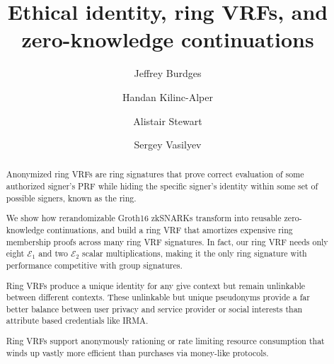 \documentclass[runningheads,evcountsame,a4paper,11pt,orivec]{llncs}
\title{Ethical identity, ring VRFs, and zero-knowledge continuations}
\author{Jeffrey Burdges \and Handan Kilinc-Alper \and Alistair Stewart \and Sergey Vasilyev}
\date{}
\def\eprint#1#2{#2} %
\def\eprintsmallskip{\smallskip}{}
\begin{document}
	
\maketitle

\begin{abstract}
Anonymized ring VRFs are ring signatures that prove correct evaluation of some authorized signer's PRF while hiding the specific signer's identity within some set of possible signers, known as the ring.
\eprint{We propose ring VRFs as a natural fulcrum around which a diverse array of zkSNARK circuits turn, making them an ideal target for optimization and eventually standards.

}{}
\eprintsmallskip

We show how rerandomizable Groth16 zkSNARKs transform into reusable zero-knowledge continuations, and build a ring VRF that amortizes expensive ring membership proofs across many ring VRF signatures.
In  fact, our ring VRF needs only eight $\mathcal{E}_1$ and two $\mathcal{E}_2$ scalar multiplications, making it the only ring signature with performance competitive with group signatures.

\eprintsmallskip

Ring VRFs produce a unique identity for any give context but remain unlinkable between different contexts.  These unlinkable but unique pseudonyms provide a far better balance between user privacy and service provider or social interests than attribute based credentials like IRMA.

\eprintsmallskip

Ring VRFs support anonymously rationing or rate limiting resource consumption that winds up vastly more efficient than purchases via money-like protocols.
\end{abstract}



% 
















\appendix

% 






\end{document}
